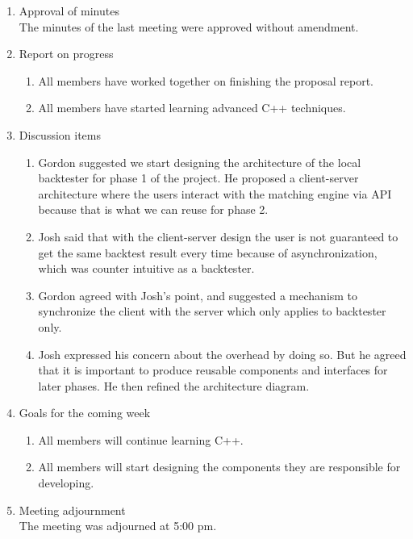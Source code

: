 \documentclass[12pt,a4paper]{article}
\begin{document}
\begin{enumerate}
\item Approval of minutes\\
The minutes of the last meeting were approved without amendment.\\
\item Report on progress
\begin{enumerate}
\item All members have worked together on finishing the proposal report.\\
\item All members have started learning advanced C++ techniques.\\
\end{enumerate}
\item Discussion items
\begin{enumerate}
\item Gordon suggested we start designing the architecture of the local backtester for phase 1 of the project. He proposed a client-server architecture where the users interact with the matching engine via API because that is what we can reuse for phase 2.\\
\item Josh said that with the client-server design the user is not guaranteed to get the same backtest result every time because of asynchronization, which was counter intuitive as a backtester.\\
\item Gordon agreed with Josh's point, and suggested a mechanism to synchronize the client with the server which only applies to backtester only.\\
\item Josh expressed his concern about the overhead by doing so. But he agreed that it is important to produce reusable components and interfaces for later phases. He then refined the architecture diagram.\\
\end{enumerate}
\item Goals for the coming week
\begin{enumerate}
\item All members will continue learning C++.\\
\item All members will start designing the components they are responsible for developing.\\
\end{enumerate}
\item Meeting adjournment\\
The meeting was adjourned at 5:00 pm.
\end{enumerate}
\end{document}
